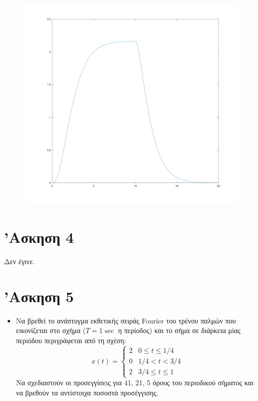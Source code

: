 \documentclass{article}
\begin{document}
\begin{figure}[H]
	\centering
	\includegraphics[width=\linewidth]{res/fig3.png}
\end{figure}

\section{'Ασκηση 4}

Δεν έγινε.

\section{'Ασκηση 5}

\begin{itemize}
	\item Να βρεθεί το ανάπτυγμα εκθετικής σειράς Fourier του
		τρένου παλμών που εικονίζεται στο σχήμα ($T = 1\sec$
		η περίοδος) και το σήμα σε διάρκεια μίας περιόδου
		περιγράφεται από τη σχέση:
		\[
			x(t) = 
			\left\{
				\begin{array}{ll}
				2 & 0 \leq t \leq 1/4 \\
				0 & 1/4 < t < 3/4 \\
				2 & 3/4 \leq t \leq 1
			\end{array}
			\right.
		\]
		Να σχεδιαστούν οι προσεγγίσεις για 41, 21, 5 όρους του
		περιοδικού σήματος και να βρεθούν τα αντίστοιχα ποσοστά
		προσέγγισης.
\end{itemize}
\end{document}
